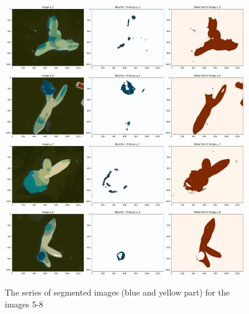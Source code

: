 \documentclass{article}
\begin{document}
\begin{figure}[h!]
\centering
\includegraphics[width=0.95\textwidth]{Report/Images/Appendix Images/ColorSegments/Image5.png}
\includegraphics[width=0.95\textwidth]{Report/Images/Appendix Images/ColorSegments/Image6.png}
\includegraphics[width=0.95\textwidth]{Report/Images/Appendix Images/ColorSegments/Image7.png}
\includegraphics[width=0.95\textwidth]{Report/Images/Appendix Images/ColorSegments/Image8.png}
\caption{The series of segmented images (blue and yellow part) for the images 5-8} 
\label{fig:segment5-8}
\end{figure}
\end{document}
